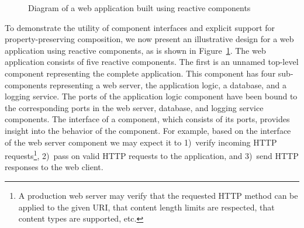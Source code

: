 \begin{figure}
\centering
{}%
\caption{Diagram of a web application built using reactive components\label{web_server}}
\end{figure}

To demonstrate the utility of component interfaces and explicit support for property-preserving composition, we now present an illustrative design for a web application using reactive components, as is shown in Figure~\ref{web_server}.
The web application consists of five reactive components.
The first is an unnamed top-level component representing the complete application.
This component has four sub-components representing a web server, the application logic, a database, and a logging service.
The ports of the application logic component have been bound to the corresponding ports in the web server, database, and logging service components.
The interface of a component, which consists of its ports, provides insight into the behavior of the component.
For example, based on the interface of the web server component we may expect it to 1)~verify incoming HTTP requests\footnote{A production web server may verify that the requested HTTP method can be applied to the given URI, that content length limits are respected, that content types are supported, etc.}, 2)~pass on valid HTTP requests to the application, and 3)~send HTTP responses to the web client.

